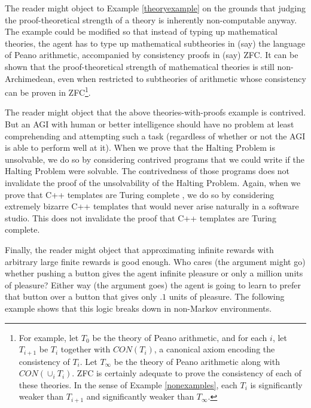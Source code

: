 \documentclass[reqno]{article}
\theoremstyle{definition}
\begin{document}
The reader might object to Example \ref{theoryexample} on the grounds that
judging the proof-theoretical
strength of a theory is inherently non-computable anyway. The example could be
modified so that instead of typing up mathematical theories, the agent has to
type up mathematical subtheories in (say) the language of Peano arithmetic,
accompanied by consistency proofs in (say) ZFC. It can be shown that the
proof-theoretical strength of mathematical theories is still non-Archimedean,
even when restricted to subtheories of arithmetic whose consistency can be
proven in ZFC\footnote{For example, let $T_0$ be the theory of Peano arithmetic,
and for each $i$, let $T_{i+1}$ be $T_i$ together with $CON(T_i)$, a canonical axiom
encoding the consistency of $T_i$. Let $T_\infty$ be the theory of Peano arithmetic
along with $CON(\cup_i T_i)$. ZFC is certainly adequate to prove the consistency of
each of these theories. In the sense of Example \ref{nonexamples}, each $T_{i}$ is
significantly weaker than $T_{i+1}$ and significantly weaker than $T_\infty$.}.

The reader might object that the above theories-with-proofs example is contrived.
But an AGI with human or better intelligence should have no problem
at least comprehending and attempting such a task (regardless of whether or not
the AGI is able to perform well at it). When we prove that the Halting Problem
is unsolvable, we do so by considering contrived programs that we could write if
the Halting Problem were solvable. The contrivedness of those programs does not
invalidate the proof of the unsolvability of the Halting Problem. Again, when we
prove that C++ templates are Turing complete \cite{veldhuizen}, we do so by
considering extremely
bizarre C++ templates that would never arise naturally in a software
studio. This does not invalidate the proof that C++ templates are Turing complete.

Finally, the reader might object that approximating infinite rewards with arbitrary
large finite rewards is good enough. Who cares (the argument might go) whether
pushing a button gives the agent infinite pleasure or only a million units of pleasure?
Either way (the argument goes) the agent is going to learn to prefer that button
over a button that gives only $.1$ units of pleasure. The following example shows
that this logic breaks down in non-Markov environments.
\end{document}
